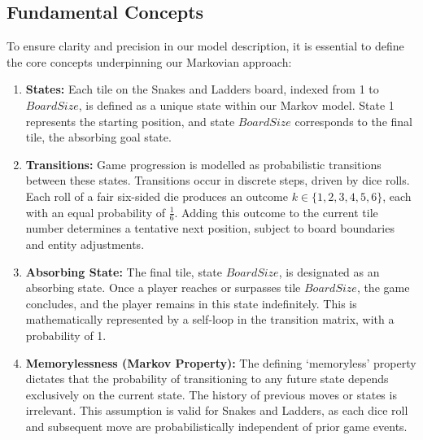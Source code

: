 \subsection{Fundamental Concepts}
To ensure clarity and precision in our model description, it is essential to define the core concepts underpinning our Markovian approach:
\begin{enumerate}
	\item \textbf{States:} Each tile on the Snakes and Ladders board, indexed from 1 to $BoardSize$, is defined as a unique state within our Markov model. State 1 represents the starting position, and state $BoardSize$ corresponds to the final tile, the absorbing goal state.
	\item \textbf{Transitions:} Game progression is modelled as probabilistic transitions between these states. Transitions occur in discrete steps, driven by dice rolls. Each roll of a fair six-sided die produces an outcome $k \in \{1, 2, 3, 4, 5, 6\}$, each with an equal probability of $\frac{1}{6}$. Adding this outcome to the current tile number determines a tentative next position, subject to board boundaries and entity adjustments.
	\item \textbf{Absorbing State:} The final tile, state $BoardSize$, is designated as an absorbing state. Once a player reaches or surpasses tile $BoardSize$, the game concludes, and the player remains in this state indefinitely. This is mathematically represented by a self-loop in the transition matrix, with a probability of 1.
	\item \textbf{Memorylessness (Markov Property):} The defining ‘memoryless’ property dictates that the probability of transitioning to any future state depends exclusively on the current state. The history of previous moves or states is irrelevant. This assumption is valid for Snakes and Ladders, as each dice roll and subsequent move are probabilistically independent of prior game events.
\end{enumerate}

